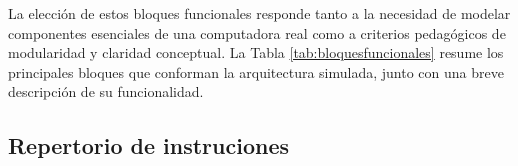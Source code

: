 \documentclass[12pt,oneside]{templates/unerthesis}
\begin{document}
La elección de estos bloques funcionales responde tanto a la necesidad de modelar componentes esenciales de una computadora real como a criterios pedagógicos de modularidad y claridad conceptual. La Tabla \ref{tab:bloquesfuncionales} resume los principales bloques que conforman la arquitectura simulada, junto con una breve descripción de su funcionalidad.

\begin{table}[!h]
\centering
\caption{\label{tab:bloquesfuncionales}Bloques funcionales principales}
\centering
{}
\end{table}

\hypertarget{repertorio-de-instruciones}{%
\subsection{Repertorio de instruciones}\label{repertorio-de-instruciones}}
\end{document}
